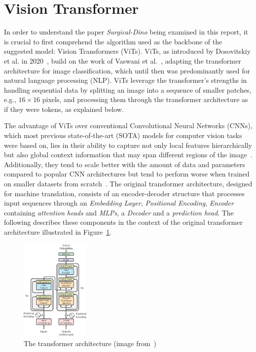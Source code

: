 \section{Vision Transformer}\label{sec:vision-transformer}
In order to understand the paper \emph{Surgical-Dino} being examined in this report, it is crucial to first comprehend the algorithm used as the backbone of the suggested model: Vision Transformers (ViTs).
ViTs, as introduced by Dosovitskiy et al. in 2020~\cite{Dosovitskiy2020}, build on the work of Vaswani et al.~\cite{Vaswani2017}, adapting the transformer architecture for image classification, which until then was predominantly used for natural language processing (NLP). 
ViTs leverage the transformer's strengths in handling sequential data by splitting an image into a sequence of smaller patches, e.g., $16\times16$ pixels, and processing them through the transformer architecture as if they were tokens, as explained below.

The advantage of ViTs over conventional Convolutional Neural Networks (CNNs), which most previous state-of-the-art (SOTA) models for computer vision tasks were based on, lies in their ability to capture not only local features hierarchically but also global context information that may span different regions of the image~\cite{Khan2023}.
Additionally, they tend to scale better with the amount of data and parameters compared to popular CNN architectures but tend to perform worse when trained on smaller datasets from scratch~\cite{Han2023}.
The original transformer architecture, designed for machine translation, consists of an encoder-decoder structure that processes input sequences through an \emph{Embedding Layer}, \emph{Positional Encoding}, \emph{Encoder} containing \emph{attention heads} and \emph{MLPs}, a \emph{Decoder} and a \emph{prediction head}.
The following describes these components in the context of the original transformer architecture illustrated in Figure~\ref{fig:transformer}.
\begin{figure}[h!]
    \centering
    \includegraphics[width=0.3\textwidth]{images/TransformerArchitectureVaswani2017TransformerPage3.png}
    \caption[The original transformer architecture]{The transformer architecture (image from~\cite{Vaswani2017})}\label{fig:transformer}
\end{figure}

